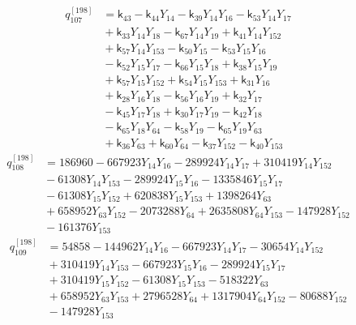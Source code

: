 \begin{equation}\label{q198:row:107}
\begin{aligned}
q_{107}^{[198]} &={} \mathsf{k}_{43} - \mathsf{k}_{44}Y_{14} - \mathsf{k}_{39}Y_{14}Y_{16} - \mathsf{k}_{53}Y_{14}Y_{17}\\
&{} + \mathsf{k}_{33}Y_{14}Y_{18} - \mathsf{k}_{67}Y_{14}Y_{19} + \mathsf{k}_{41}Y_{14}Y_{152}\\
&{} + \mathsf{k}_{57}Y_{14}Y_{153} - \mathsf{k}_{50}Y_{15} - \mathsf{k}_{53}Y_{15}Y_{16}\\
&{} - \mathsf{k}_{52}Y_{15}Y_{17} - \mathsf{k}_{66}Y_{15}Y_{18} + \mathsf{k}_{38}Y_{15}Y_{19}\\
&{} + \mathsf{k}_{57}Y_{15}Y_{152} + \mathsf{k}_{54}Y_{15}Y_{153} + \mathsf{k}_{31}Y_{16}\\
&{} + \mathsf{k}_{28}Y_{16}Y_{18} - \mathsf{k}_{56}Y_{16}Y_{19} + \mathsf{k}_{32}Y_{17}\\
&{} - \mathsf{k}_{45}Y_{17}Y_{18} + \mathsf{k}_{30}Y_{17}Y_{19} - \mathsf{k}_{42}Y_{18}\\
&{} - \mathsf{k}_{65}Y_{18}Y_{64} - \mathsf{k}_{58}Y_{19} - \mathsf{k}_{65}Y_{19}Y_{63}\\
&{} + \mathsf{k}_{36}Y_{63} + \mathsf{k}_{60}Y_{64} - \mathsf{k}_{37}Y_{152} - \mathsf{k}_{40}Y_{153}
\end{aligned}
\end{equation}
\begin{equation}\label{q198:row:108}
\begin{aligned}
q_{108}^{[198]} &={} 186960 - 667923Y_{14}Y_{16} - 289924Y_{14}Y_{17} + 310419Y_{14}Y_{152}\\
&{} - 61308Y_{14}Y_{153} - 289924Y_{15}Y_{16} - 1335846Y_{15}Y_{17}\\
&{} - 61308Y_{15}Y_{152} + 620838Y_{15}Y_{153} + 1398264Y_{63}\\
&{} + 658952Y_{63}Y_{152} - 2073288Y_{64} + 2635808Y_{64}Y_{153} - 147928Y_{152}\\
&{} - 161376Y_{153}
\end{aligned}
\end{equation}
\begin{equation}\label{q198:row:109}
\begin{aligned}
q_{109}^{[198]} &={} 54858 - 144962Y_{14}Y_{16} - 667923Y_{14}Y_{17} - 30654Y_{14}Y_{152}\\
&{} + 310419Y_{14}Y_{153} - 667923Y_{15}Y_{16} - 289924Y_{15}Y_{17}\\
&{} + 310419Y_{15}Y_{152} - 61308Y_{15}Y_{153} - 518322Y_{63}\\
&{} + 658952Y_{63}Y_{153} + 2796528Y_{64} + 1317904Y_{64}Y_{152} - 80688Y_{152}\\
&{} - 147928Y_{153}
\end{aligned}
\end{equation}
